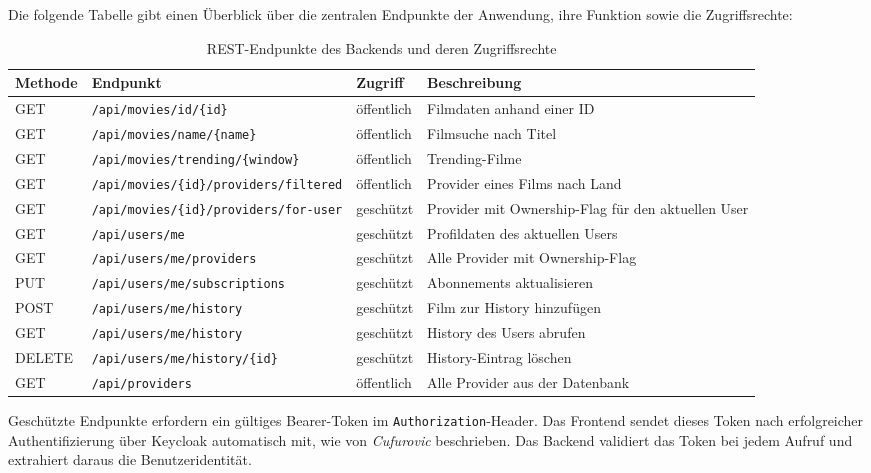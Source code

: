 Die folgende Tabelle gibt einen Überblick über die zentralen Endpunkte
der Anwendung, ihre Funktion sowie die Zugriffsrechte:

\begin{table}[h]
\centering
\small
\begin{tabular}{|l|l|l|p{4cm}|}
\hline
\textbf{Methode} & \textbf{Endpunkt} & \textbf{Zugriff} & \textbf{Beschreibung} \\
\hline
GET & \texttt{/api/movies/id/\{id\}} & öffentlich &
    Filmdaten anhand einer ID \\
GET & \texttt{/api/movies/name/\{name\}} & öffentlich &
    Filmsuche nach Titel \\
GET & \texttt{/api/movies/trending/\{window\}} & öffentlich &
    Trending-Filme \\
GET & \texttt{/api/movies/\{id\}/providers/filtered} & öffentlich &
    Provider eines Films nach Land \\
GET & \texttt{/api/movies/\{id\}/providers/for-user} & geschützt &
    Provider mit Ownership-Flag für den aktuellen User \\
GET & \texttt{/api/users/me} & geschützt &
    Profildaten des aktuellen Users \\
GET & \texttt{/api/users/me/providers} & geschützt &
    Alle Provider mit Ownership-Flag \\
PUT & \texttt{/api/users/me/subscriptions} & geschützt &
    Abonnements aktualisieren \\
POST & \texttt{/api/users/me/history} & geschützt &
    Film zur History hinzufügen \\
GET & \texttt{/api/users/me/history} & geschützt &
    History des Users abrufen \\
DELETE & \texttt{/api/users/me/history/\{id\}} & geschützt &
    History-Eintrag löschen \\
GET & \texttt{/api/providers} & öffentlich &
    Alle Provider aus der Datenbank \\
\hline
\end{tabular}
\caption{REST-Endpunkte des Backends und deren Zugriffsrechte}
\label{tab:rest_endpoints}
\end{table}

Geschützte Endpunkte erfordern ein gültiges Bearer-Token im
\texttt{Authorization}-Header. Das Frontend sendet dieses Token nach
erfolgreicher Authentifizierung über Keycloak automatisch mit, wie von
\textit{Cufurovic} beschrieben. Das Backend validiert das Token bei
jedem Aufruf und extrahiert daraus die Benutzeridentität.

